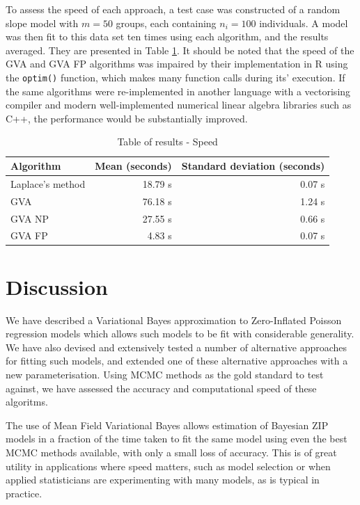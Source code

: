 \documentclass{article}[12pt]
\begin{document}
	
	To assess the speed of each approach, a test case was constructed of a random slope model with $m=50$ groups,
	each containing $n_i = 100$ individuals. A model was then fit to this data set ten times using each algorithm,
	and the results averaged. They are presented in Table \ref{tab:application_slope_speed}. It should be noted
	that the speed of the GVA and GVA FP algorithms was impaired by their implementation in R using the
	\texttt{optim()} function, which makes many function calls during its' execution. If the same algorithms were
	re-implemented in another language with a vectorising compiler and modern well-implemented numerical linear
	algebra libraries such as C++, the performance would be substantially improved.
	
	\begin{table}
		\caption{Table of results - Speed}
		\label{tab:application_slope_speed}
		\begin{tabular}{|l|rr|}
			\hline
			Algorithm        & Mean (seconds) & Standard deviation (seconds) \\
			\hline
			Laplace's method & 18.79 s        & 0.07 s                       \\
			GVA              & 76.18 s        & 1.24 s                       \\
			GVA NP           & 27.55 s        & 0.66 s                       \\
			GVA FP           & 4.83 s         & 0.07 s                       \\
			\hline
		\end{tabular}
	\end{table}
	
	\section{Discussion}
	\label{sec:discussion}
	
	We have described a Variational Bayes approximation to Zero-Inflated Poisson regression models which allows
	such models to be fit with considerable generality. We have also devised and extensively tested a number of
	alternative approaches for fitting such models, and extended one of these alternative approaches with a new
	parameterisation. Using MCMC methods as the gold standard to test against, we have assessed the accuracy and
	computational speed of these algoritms.
	
	The use of Mean Field Variational Bayes allows estimation of Bayesian ZIP models in a fraction of the time
	taken to fit the same model using even the best MCMC methods available, with only a small loss of accuracy.
	This is of great utility in applications where speed matters, such as model selection or when applied
	statisticians are experimenting with many models, as is typical in practice.
	
\end{document}
